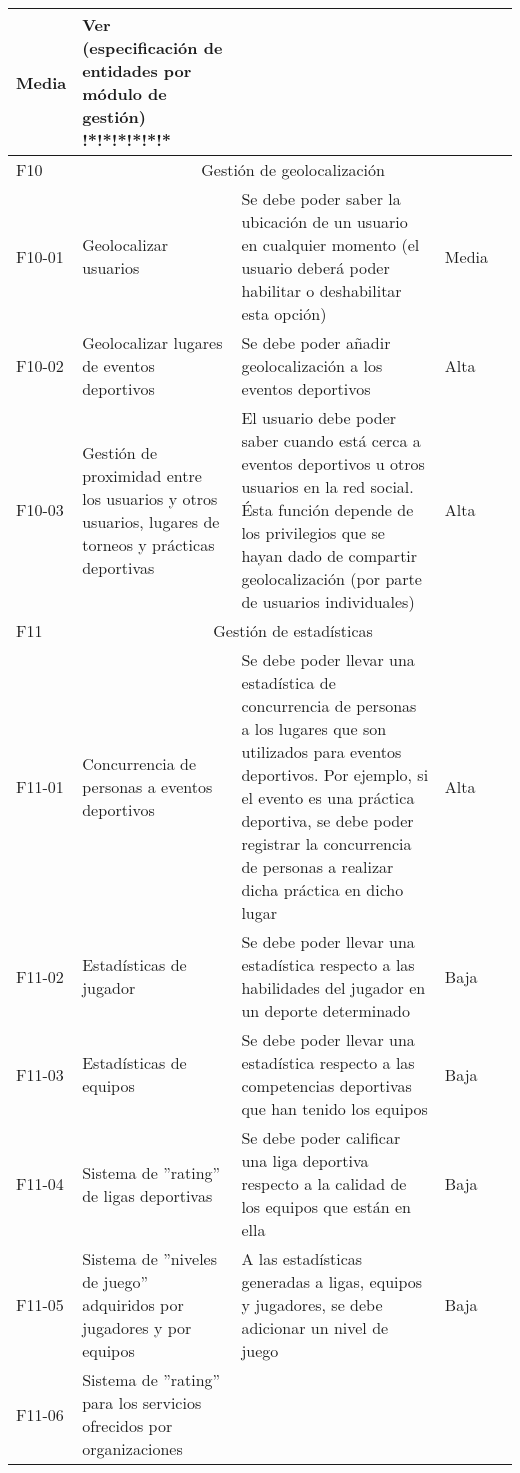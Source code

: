\begin{center}
\begin{longtable}{|p{1.5cm}|p{3cm}|p{5cm}|p{2cm}|p{3cm}|}
			Media & 
			Ver (especificación de entidades por módulo de gestión) !*!*!*!*!*!* \\
			\hline
			F10 & 
			\multicolumn{4}{c|}{Gestión de geolocalización} \\
			\hline
			F10-01 & 
			Geolocalizar usuarios & 
			Se debe poder saber la ubicación de un usuario en cualquier momento (el usuario deberá poder habilitar o deshabilitar esta opción) &
			Media & 
			\\
			\hline
			F10-02 & 
			Geolocalizar lugares de eventos deportivos & 
			Se debe poder añadir geolocalización a los eventos deportivos &
			Alta & 
			\\
			\hline
			F10-03 & 
			Gestión de proximidad entre los usuarios y otros usuarios, lugares de torneos y prácticas deportivas & 
			El usuario debe poder saber cuando está cerca a eventos deportivos u otros usuarios
en la red social. Ésta función depende de los privilegios que se hayan dado de compartir geolocalización (por parte de usuarios individuales) &
			Alta & 
			\\
			\hline
			F11 & 
			\multicolumn{4}{c|}{Gestión de estadísticas} \\
			\hline
			F11-01 & 
			Concurrencia de personas a eventos deportivos & 
			Se debe poder llevar una estadística de concurrencia de personas a los lugares que  son utilizados para eventos deportivos. Por ejemplo, si el evento es una práctica deportiva, se debe poder registrar la concurrencia de personas a realizar dicha práctica en dicho lugar &
			Alta & 
			\\
			\hline
			F11-02 & 
			Estadísticas de jugador & 
			Se debe poder llevar una estadística respecto a las habilidades del jugador en un
deporte determinado &
			Baja & 
			\\
			F11-03 & 
			Estadísticas de equipos & 
			Se debe poder llevar una estadística respecto a las competencias deportivas que
han tenido los equipos &
			Baja & 
			\\
			\hline
			F11-04 & 
			Sistema de ''rating'' de ligas deportivas & 
			Se debe poder calificar una liga deportiva respecto a la calidad de los equipos que están en ella &
			Baja & 
			\\
			\hline
			F11-05 & 
			Sistema de ''niveles de juego'' adquiridos por jugadores y por equipos & 
			A las estadísticas generadas a ligas, equipos y jugadores, se debe adicionar un nivel de juego &
			Baja & 
			\\
			\hline
			F11-06 & 
			Sistema de ''rating'' para los servicios ofrecidos por organizaciones & 

\end{longtable}
\end{center}
